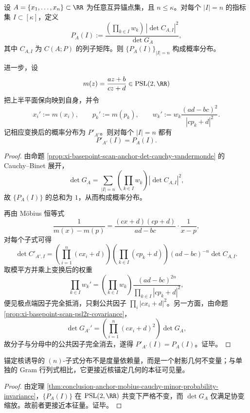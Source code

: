 \begin{theorem}\label{thm:conclusion-anchor-mobius-cauchy-minor-probability-invariance}
设 \(A=\{x_1,\dots,x_n\}\subset\RR\) 为任意互异锚点集，且 \(n\le \kappa\)。对每个 \(|I|=n\) 的指标集 \(I\subset[\kappa]\)，定义
\[
P_A(I):=
\frac{
\left(\prod_{k\in I}w_k\right)\,|\det C_{A,I}|^2
}{
\det G_A
},
\]
其中 \(C_{A,I}\) 为 \(C(A;P)\) 的列子矩阵。则 \(\{P_A(I)\}_{|I|=n}\) 构成概率分布。

进一步，设
\[
m(z)=\frac{az+b}{cz+d}\in \mathrm{PSL}(2,\RR)
\]
把上半平面保向映到自身，并令
\[
x_i':=m(x_i),\qquad
p_k':=m(p_k),\qquad
w_k':=w_k\frac{(ad-bc)^2}{|cp_k+d|^2}.
\]
记相应变换后的概率分布为 \(P'_{A'}\)。则对每个 \(|I|=n\) 都有
\[
P'_{A'}(I)=P_A(I).
\]
\end{theorem}
\begin{proof}
由命题 \ref{prop:xi-basepoint-scan-anchor-det-cauchy-vandermonde} 的 Cauchy--Binet 展开，
\[
\det G_A
=
\sum_{|I|=n}\left(\prod_{k\in I}w_k\right)|\det C_{A,I}|^2,
\]
故 \(\{P_A(I)\}\) 的总和为 \(1\)，从而构成概率分布。

再由 Möbius 恒等式
\[
\frac{1}{m(x)-m(p)}
=
\frac{(cx+d)(cp+d)}{ad-bc}\cdot \frac{1}{x-p},
\]
对每个子式可得
\[
\det C'_{A',I}
=
\left(\prod_{i=1}^{n}(cx_i+d)\right)
\left(\prod_{k\in I}(cp_k+d)\right)
(ad-bc)^{-n}\det C_{A,I}.
\]
取模平方并乘上变换后的权重
\[
\prod_{k\in I}w_k'
=
\left(\prod_{k\in I}w_k\right)\frac{(ad-bc)^{2n}}{\prod_{k\in I}|cp_k+d|^2},
\]
便见极点端因子完全抵消，只剩公共因子 \(\prod_i |cx_i+d|^2\)。另一方面，由命题 \ref{prop:xi-basepoint-scan-psl2r-covariance}，
\[
\det G_{A'}'
=
\left(\prod_{i=1}^{n}(cx_i+d)^2\right)\det G_A,
\]
故分子与分母中的公共因子完全消去，遂得 \(P'_{A'}(I)=P_A(I)\)。证毕。
\end{proof}

\begin{corollary}[子式分布的射影几何本征性]\label{cor:conclusion-anchor-minor-distribution-projective-intrinsic}
锚定核诱导的 \((n)\)-子式分布不是度量依赖量，而是一个射影几何不变量；与单独的 Gram 行列式相比，它更接近核锚定几何的本征可见量。
\end{corollary}
\begin{proof}
由定理 \ref{thm:conclusion-anchor-mobius-cauchy-minor-probability-invariance}，\(\{P_A(I)\}\) 在 \(\mathrm{PSL}(2,\RR)\) 共变下严格不变，而 \(\det G_A\) 仅满足协变缩放。故前者更接近本征量。证毕。
\end{proof}

